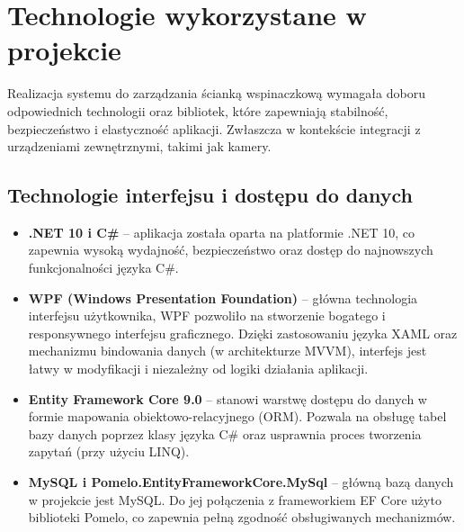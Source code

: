 \chapter{Technologie wykorzystane w projekcie}
\label{ch:technologie}

Realizacja systemu do zarządzania ścianką wspinaczkową wymagała doboru odpowiednich technologii oraz bibliotek, które zapewniają stabilność, bezpieczeństwo i elastyczność aplikacji. Zwłaszcza w kontekście integracji z urządzeniami zewnętrznymi, takimi jak kamery.

\section{Technologie interfejsu i dostępu do danych}
\begin{itemize}
    \item \textbf{.NET 10 i C\#} -- aplikacja została oparta na platformie .NET 10, co zapewnia wysoką wydajność, bezpieczeństwo oraz dostęp do najnowszych funkcjonalności języka C\#.
    \item \textbf{WPF (Windows Presentation Foundation)} -- główna technologia interfejsu użytkownika, WPF pozwoliło na stworzenie bogatego i responsywnego interfejsu graficznego. Dzięki zastosowaniu języka XAML oraz mechanizmu bindowania danych (w architekturze MVVM), interfejs jest łatwy w modyfikacji i niezależny od logiki działania aplikacji.
    \item \textbf{Entity Framework Core 9.0} -- stanowi warstwę dostępu do danych w formie mapowania obiektowo-relacyjnego (ORM). Pozwala na obsługę tabel bazy danych poprzez klasy języka C\# oraz usprawnia proces tworzenia zapytań (przy użyciu LINQ).
    \item \textbf{MySQL i Pomelo.EntityFrameworkCore.MySql} -- główną bazą danych w projekcie jest MySQL. Do jej połączenia z frameworkiem EF Core użyto biblioteki Pomelo, co zapewnia pełną zgodność obsługiwanych mechanizmów.
\end{itemize}

